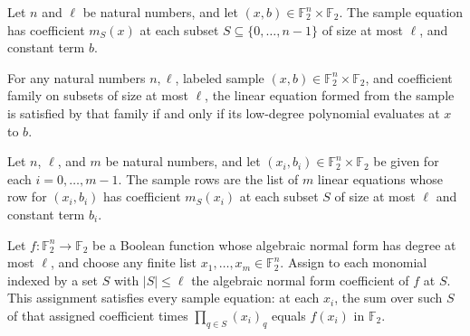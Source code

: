 \begin{definition}
\leanok
{}
Let $n$ and $\ell$ be natural numbers, and let $(x,b)\in\mathbb F_2^n\times\mathbb F_2$.
The sample equation has coefficient $m_S(x)$ at each subset $S\subseteq\{0,\ldots,n-1\}$
of size at most $\ell$, and constant term $b$.
\end{definition}

\begin{theorem}
\leanok
{}
For any natural numbers $n,\ell$, labeled sample $(x,b)\in\mathbb F_2^n\times\mathbb
F_2$, and coefficient family on subsets of size at most $\ell$, the linear equation
formed from the sample is satisfied by that family if and only if its low-degree
polynomial evaluates at $x$ to $b$.
\end{theorem}

\begin{definition}
\leanok
{}
Let $n$, $\ell$, and $m$ be natural numbers, and let $(x_i,b_i)\in\mathbb
F_2^n\times\mathbb F_2$ be given for each $i=0,\ldots,m-1$. The sample rows are the list
of $m$ linear equations whose row for $(x_i,b_i)$ has coefficient $m_S(x_i)$ at each
subset $S$ of size at most $\ell$ and constant term $b_i$.
\end{definition}

\begin{theorem}
\leanok
{}
Let $f:\mathbb F_2^n\to\mathbb F_2$ be a Boolean function whose algebraic normal form
has degree at most $\ell$, and choose any finite list $x_1,\ldots,x_m\in\mathbb F_2^n$.
Assign to each monomial indexed by a set $S$ with $|S|\le\ell$ the algebraic normal form
coefficient of $f$ at $S$. This assignment satisfies every sample equation: at each
$x_i$, the sum over such $S$ of that assigned coefficient times $\prod_{q\in S}(x_i)_q$
equals $f(x_i)$ in $\mathbb F_2$.
\end{theorem}


